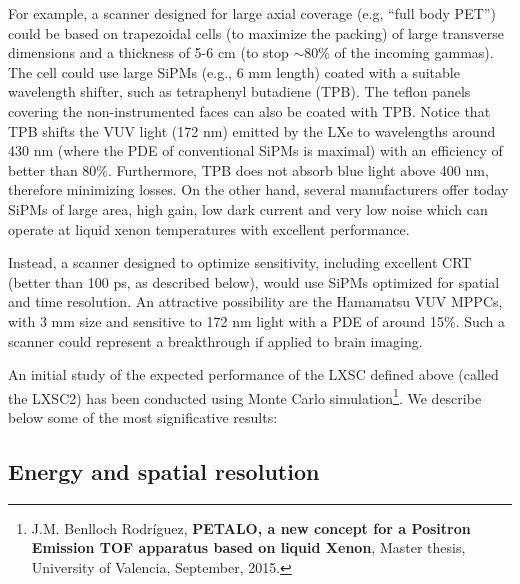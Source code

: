 \documentclass[review]{elsarticle}
\begin{document}
For example, a scanner designed for large axial coverage (e.g, ``full body PET'') could be based on trapezoidal cells (to maximize the packing) of large transverse dimensions and a thickness of 5-6 cm (to stop $\sim$80\% of the incoming gammas). The cell could use large
SiPMs (e.g., 6 mm length) coated with a suitable wavelength shifter, such as tetraphenyl butadiene (TPB). The teflon panels covering the non-instrumented faces can also be coated with TPB. Notice that TPB shifts the VUV light (172 nm) emitted by the LXe  to wavelengths around 430 nm (where the PDE of conventional SiPMs is maximal) with an efficiency of better than 80\%. Furthermore, TPB does not absorb blue light above 400 nm, therefore minimizing losses. On the other hand, several manufacturers offer today SiPMs of large area, high gain, low dark current and very low noise which can operate at liquid xenon temperatures with excellent performance.

Instead, a scanner designed to optimize sensitivity, including excellent CRT (better than 100 ps, as described below), would use SiPMs optimized for spatial and time resolution. An attractive possibility are the Hamamatsu VUV MPPCs, with 3 mm size and sensitive to 172 nm light with a PDE of around 15\%. Such a scanner could represent a breakthrough if applied to brain imaging.  

An initial study of the expected performance of the LXSC defined above (called the LXSC2) has been conducted using Monte Carlo simulation\footnote{J.M. Benlloch Rodr\'iguez, {\bf PETALO, a new concept for a Positron Emission TOF apparatus based on liquid Xenon}, Master thesis, University of Valencia, September, 2015.}. We describe below some of the most significative results:

\subsection{Energy and spatial resolution}
\end{document}
